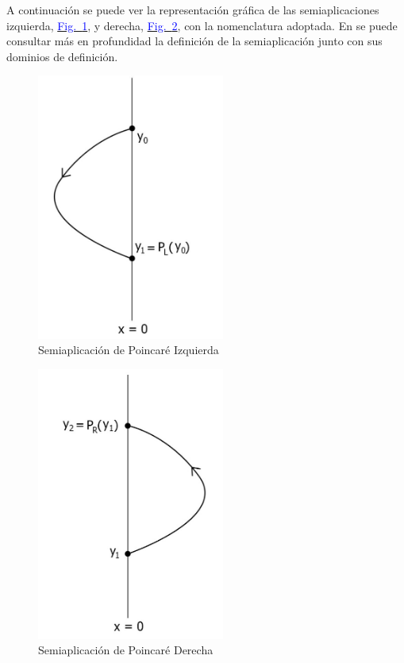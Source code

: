 \documentclass[12pt,a4paper]{report} %
\newcommand{\fref}[1]{\hyperref[#1]{\textcolor{blue}{Fig.~\ref*{#1}}}}
\newcommand{\fref}[1]{\hyperref[#1]{\textcolor{blue}{\textit{Fig.~\ref*{#1}}}}}
\begin{document}
	
	\newpage
	
	\vspace{0.5cm} A continuación se puede ver la representación gráfica de las semiaplicaciones izquierda, \fref{fig:semiL}, y derecha, \fref{fig:semiR}, con la nomenclatura adoptada. En \cite{caracterizacion} se puede consultar más en profundidad la definición de la semiaplicación junto con sus dominios de definición.

	
	\begin{figure}[h]
		\centering
		\includegraphics[width=0.55\textwidth]{semiL.jpg}
		\caption{Semiaplicación de Poincaré Izquierda}
		\label{fig:semiL}
	\end{figure}\smallskip
	

	
	\newpage
	
	\begin{figure}[h]
		\centering
		\includegraphics[width=0.55\textwidth]{semiR.jpg}
		\caption{Semiaplicación de Poincaré Derecha}
		\label{fig:semiR}
	\end{figure}\smallskip
\end{document}
